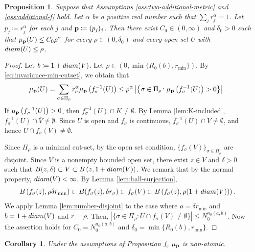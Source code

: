 \documentclass[10pt,a4paper]{amsart}
\newtheorem{Prop}[Thm]{Proposition}
\newtheorem{Cor}[Thm]{Corollary}
\begin{document}
\begin{Prop}\label{prop:mass-dist}
Suppose that Assumptions \ref{ass:two-additional-metric} and \ref{ass:additional-f}  hold. 
Let $\alpha$ be a positive real number such that $\sum_j r_j^{\alpha} = 1$. 
Let $p_j \coloneqq r_j^{\alpha}$ for each $j$ and ${\bf p} \coloneqq (p_j)_j$. 
Then there exist $C_0 \in (0,\infty)$ and $\delta_0 > 0$ such that 
$\mu_{\bf p}(U) \le C_0 \rho^{\alpha}$ for every $\rho \in (0, \delta_0)$ and every open set $U$ with $\textup{diam}(U) \le \rho$. 
\end{Prop}

\begin{proof}
Let $b \coloneqq 1 + \textup{diam}(V)$. 
Let $\rho \in \left(0, \min\{R_0 (b), r_{\min} \}\right)$. 
By \eqref{eq:invariance-min-cutset}, we obtain that 
\[ \mu_{\bf p}(U) =  \sum_{\sigma \in \Pi_{\rho}} r_{\sigma}^{\alpha} \mu_{\bf p} \left( f_{\sigma}^{-1} (U) \right) \le \rho^{\alpha} \left|\left\{\sigma \in \Pi_{\rho} \colon \mu_{\bf p} \left( f_{\sigma}^{-1} (U) \right) > 0 \right\}\right|.  \]
If $\mu_{\bf p} \left( f_{\sigma}^{-1} (U) \right) > 0$, then $f_{\sigma}^{-1} (U) \cap K \ne \emptyset$. 
By Lemma \ref{lem:K-included}, $f_{\sigma}^{-1} (U) \cap \overline{V} \ne \emptyset$. 
Since $U$ is open and $f_{\sigma}$ is continuous, 
$f_{\sigma}^{-1} (U) \cap V \ne \emptyset$, and hence $U \cap f_{\sigma}(V) \ne \emptyset$. 

Since $\Pi_{\rho}$ is a minimal cut-set, by the open set condition, 
$\{ f_{\sigma}(V) \}_{\sigma \in \Pi_{\rho}}$ are disjoint. 
Since $V$ is a nonempty bounded open set, 
there exist $z \in V$ and $\delta > 0$ such that 
$B(z,\delta) \subset V \subset B\left(z, 1+\textup{diam}(V) \right)$. 
We remark that by the normal property, $\textup{diam}(V) < \infty$.  
By Lemma \ref{lem:ball-surjection}, 
\[ B\left(f_{\sigma}(z), \rho \delta r_{\min}\right) \subset B(f_{\sigma}(z), \delta r_{\sigma}) \subset f_{\sigma}(V) \subset B\left(f_{\sigma}(z), \rho(1+ \textup{diam}(V))\right).\] 
 We apply Lemma \ref{lem:number-disjoint} to the case where $a = \delta r_{\min}$ and $b = 1+\textup{diam}(V)$ and $r = \rho$. 
 Then, $|\{\sigma \in \Pi_{\rho} \colon U \cap f_{\sigma}(V) \ne \emptyset\}| \le N_0^{n_0 (a,b)}$. 
 Now the assertion holds for $C_0 =  N_0^{n_0 (a,b)}$ and $\delta_0 = \min\{R_0 (b), r_{\min} \}$. 
\end{proof}

\begin{Cor}\label{cor:non-atomic}
Under the assumptions of Proposition \ref{prop:mass-dist}, $\mu_{\bf p}$ is non-atomic.
\end{Cor}
\end{document}
